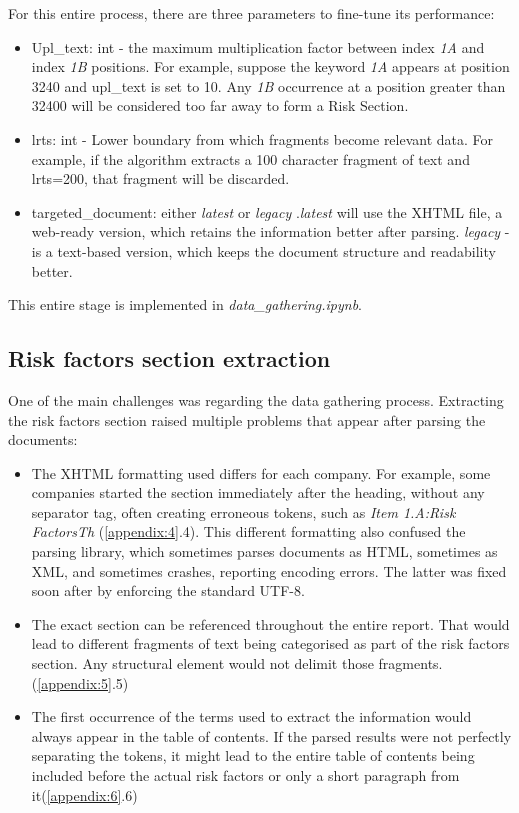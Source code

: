 \documentclass[12pt,MSc,a4paper,oneside]{muthesis}
\begin{document}
For this entire process, there are three parameters to fine-tune its performance: 
\begin{itemize}
          \item Upl\_text: int - the maximum multiplication factor between index \textit{1A} and index \textit{1B} positions. For example, suppose the keyword \textit{1A} appears at position 3240 and upl\_text is set to 10. Any \textit{1B} occurrence at a position greater than 32400 will be considered too far away to form a Risk Section.
          \item lrts: int - Lower boundary from which fragments become relevant data. For example, if the algorithm extracts a 100 character fragment of text and lrts=200, that fragment will be discarded.
          \item targeted\_document: either \textit{latest} or \textit{legacy} .\textit{latest} will use the XHTML file, a web-ready version, which retains the information better after parsing. \textit{legacy} - is a text-based version, which keeps the document structure and readability better.
\end{itemize}
This entire stage is implemented in \textit{data\_gathering.ipynb}. 

\subsection{Risk factors section extraction}

One of the main challenges was regarding the data gathering process. Extracting the risk factors section raised multiple problems that appear after parsing the documents:
\begin{itemize}
          \item The XHTML formatting used differs for each company. For example, some companies started the section immediately after the heading, without any separator tag, often creating erroneous tokens, such as \textit{ Item 1.A:Risk FactorsTh} (\ref{appendix:4}.4). This different formatting also confused the parsing library, which sometimes parses documents as HTML, sometimes as XML, and sometimes crashes, reporting encoding errors. The latter was fixed soon after by enforcing the standard UTF-8.
          \item The exact section can be referenced throughout the entire report. That would lead to different fragments of text being categorised as part of the risk factors section. Any structural element would not delimit those fragments. (\ref{appendix:5}.5)
          \item The first occurrence of the terms used to extract the information would always appear in the table of contents. If the parsed results were not perfectly separating the tokens, it might lead to the entire table of contents being included before the actual risk factors or only a short paragraph from it(\ref{appendix:6}.6)
\end{itemize}
\end{document}
